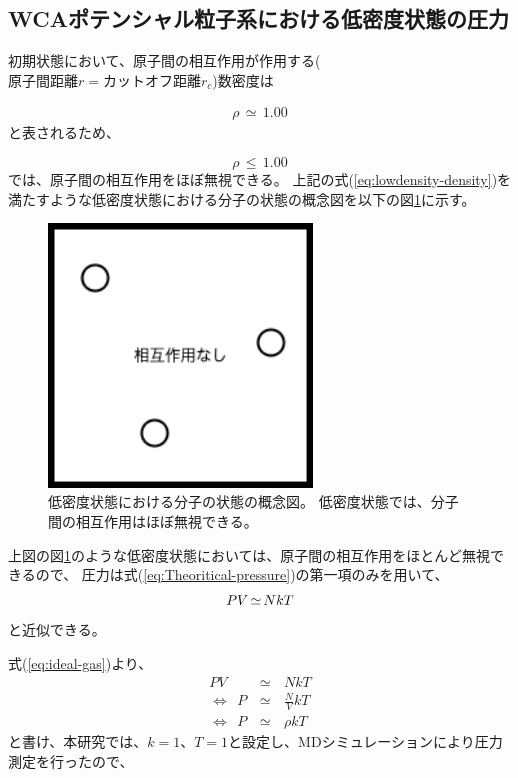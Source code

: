 \documentclass[titlepage]{jsreport}
\begin{document}
{{{\subsection{WCAポテンシャル粒子系における低密度状態の圧力}\label{results-subsec:WCA-press-low-density}
初期状態において、原子間の相互作用が作用する($原子間距離r=カットオフ距離r_c$)数密度は

\large
\begin{eqnarray}
\rho\,{\simeq}\,1.00 \nonumber
\end{eqnarray}
\normalsize
と表されるため、

\large
\begin{equation}
\rho\,{\leq}\,1.00 \label{eq:lowdensity-density}
\end{equation}
\normalsize
では、原子間の相互作用をほぼ無視できる。
上記の式(\ref{eq:lowdensity-density})を満たすような低密度状態における分子の状態の概念図を以下の図\ref{fig:lowdensity.png}に示す。

\begin{figure}[htbp]
    \begin{center}
        \includegraphics[width=7cm]{fig/lowdensity.png}
    \end{center}
    \caption{低密度状態における分子の状態の概念図。
    低密度状態では、分子間の相互作用はほぼ無視できる。}
    \label{fig:lowdensity.png}
\end{figure}

上図の図\ref{fig:lowdensity.png}のような低密度状態においては、原子間の相互作用をほとんど無視できるので、
圧力は式(\ref{eq:Theoritical-pressure})の第一項のみを用いて、
\large
\begin{equation}
PV\,{\simeq}\,NkT{\label{eq:ideal-gas}}
\end{equation}
\normalsize
と近似できる。

\newpage
式(\ref{eq:ideal-gas})より、
\large
\begin{eqnarray}
PV\,&{\simeq}&\,NkT\nonumber\\
{\Leftrightarrow}{\ }{\ }P\,&{\simeq}&\,{\frac{N}{V}}kT\nonumber\\
{\Leftrightarrow}{\ }{\ }P\,&{\simeq}&\,{\rho}kT\nonumber
\end{eqnarray}
\normalsize
と書け、本研究では、$k=1$、$T=1$と設定し、MDシミュレーションにより圧力測定を行ったので、

}}}
\end{document}
